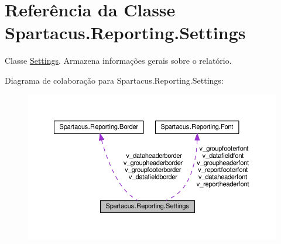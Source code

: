 \hypertarget{classSpartacus_1_1Reporting_1_1Settings}{\section{Referência da Classe Spartacus.\+Reporting.\+Settings}
\label{classSpartacus_1_1Reporting_1_1Settings}
}


Classe \hyperlink{classSpartacus_1_1Reporting_1_1Settings}{Settings}. Armazena informações gerais sobre o relatório.  




Diagrama de colaboração para Spartacus.\+Reporting.\+Settings\+:\nopagebreak
\begin{figure}[H]
\begin{center}
\leavevmode
\includegraphics[width=350pt]{classSpartacus_1_1Reporting_1_1Settings__coll__graph}
\end{center}
\end{figure}
